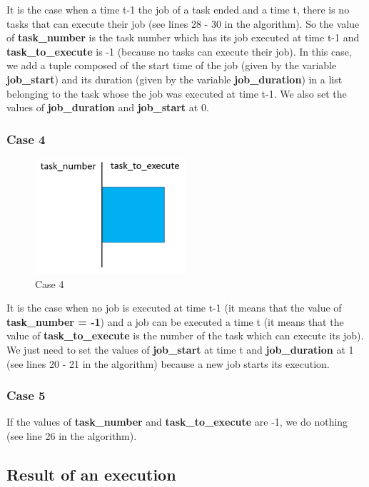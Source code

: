 \documentclass[a4paper,12pt]{article}
\begin{document}
\smallskip
\noindent
It is the case when a time t-1 the job of a task ended and a time t, there is no tasks that can execute their job (see lines 28 - 30 in the algorithm). So the value of \textbf{task\_number} is the task number which has its job executed at time t-1 and \textbf{task\_to\_execute} is -1 (because no tasks can execute their job). In this case, we add a tuple composed of the start time of the job (given by the variable \textbf{job\_start}) and its duration (given by the variable \textbf{job\_duration}) in a list belonging to the task whose the job was executed at time t-1. We also set the values of \textbf{job\_duration} and \textbf{job\_start} at 0.

\subsubsection{Case 4}

\begin{figure}[h!]
  \centering
  \includegraphics[width=0.5\textwidth]{Resources_tex/Pictures/Case4.jpg}
  \caption{Case 4}
  \label{fig: Case 4}
\end{figure}

\smallskip
\noindent
It is the case when no job is executed at time t-1 (it means that the value of \textbf{task\_number = -1}) and a job can be executed a time t (it means that the value of \textbf{task\_to\_execute} is the number of the task which can execute its job). We just need to set the values of \textbf{job\_start} at time t and \textbf{job\_duration} at 1 (see lines 20 - 21 in the algorithm) because a new job starts its execution.

\subsubsection{Case 5}
If the values of \textbf{task\_number} and \textbf{task\_to\_execute} are -1, we do nothing (see line 26 in the algorithm). 

\newpage
\subsection{Result of an execution}
\end{document}
